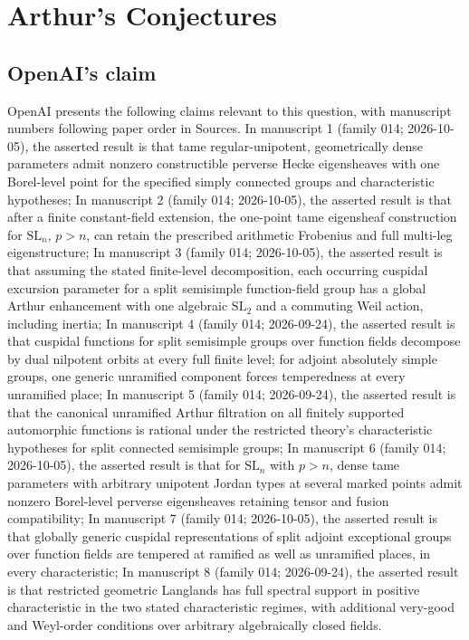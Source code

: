 \documentclass[11pt]{article}
\begin{document}
\section*{Arthur's Conjectures}

\subsection{OpenAI's claim}
OpenAI presents the following claims relevant to this question, with manuscript numbers following paper order in Sources. In manuscript 1 (family 014; 2026-10-05), the asserted result is that tame regular-unipotent, geometrically dense parameters admit nonzero constructible perverse Hecke eigensheaves with one Borel-level point for the specified simply connected groups and characteristic hypotheses; In manuscript 2 (family 014; 2026-10-05), the asserted result is that after a finite constant-field extension, the one-point tame eigensheaf construction for $\mathrm{SL}_n$, $p>n$, can retain the prescribed arithmetic Frobenius and full multi-leg eigenstructure; In manuscript 3 (family 014; 2026-10-05), the asserted result is that assuming the stated finite-level decomposition, each occurring cuspidal excursion parameter for a split semisimple function-field group has a global Arthur enhancement with one algebraic $\mathrm{SL}_2$ and a commuting Weil action, including inertia; In manuscript 4 (family 014; 2026-09-24), the asserted result is that cuspidal functions for split semisimple groups over function fields decompose by dual nilpotent orbits at every full finite level; for adjoint absolutely simple groups, one generic unramified component forces temperedness at every unramified place; In manuscript 5 (family 014; 2026-09-24), the asserted result is that the canonical unramified Arthur filtration on all finitely supported automorphic functions is rational under the restricted theory's characteristic hypotheses for split connected semisimple groups; In manuscript 6 (family 014; 2026-10-05), the asserted result is that for $\mathrm{SL}_n$ with $p>n$, dense tame parameters with arbitrary unipotent Jordan types at several marked points admit nonzero Borel-level perverse eigensheaves retaining tensor and fusion compatibility; In manuscript 7 (family 014; 2026-10-05), the asserted result is that globally generic cuspidal representations of split adjoint exceptional groups over function fields are tempered at ramified as well as unramified places, in every characteristic; In manuscript 8 (family 014; 2026-09-24), the asserted result is that restricted geometric Langlands has full spectral support in positive characteristic in the two stated characteristic regimes, with additional very-good and Weyl-order conditions over arbitrary algebraically closed fields.
\end{document}
